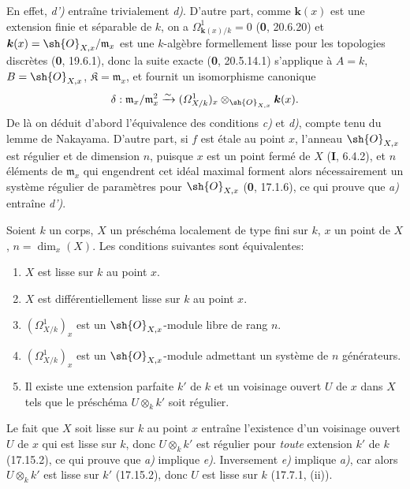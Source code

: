 En effet, \emph{d')} entraîne trivialement \emph{d)}. D'autre part, comme $\boldsymbol{k}(x)$ est une extension finie et séparable de $k$, on a $\Omega^1_{\mathbf{k}(x)/k}=0$ (\textbf{0}, 20.6.20) et $\boldsymbol{k}(x)=\sh{O}_{X,x}/\mathfrak m_x$ est une $k$-algèbre formellement lisse pour les topologies discrètes (\textbf{0}, 19.6.1), donc la suite exacte (\textbf{0}, 20.5.14.1) s'applique à $A=k$, $B=\sh{O}_{X,x}$, $\mathfrak{K}=\mathfrak m_x$, et fournit un isomorphisme canonique
\[
\delta:\mathfrak m_x/\mathfrak m_x^2\xrightarrow{\sim}(\varOmega^1_{X/k})_x\otimes_{\sh{O}_{X,x}}\boldsymbol{k}(x).
\]
De là on déduit d'abord l'équivalence des conditions \emph{c)} et \emph{d)}, compte tenu du lemme de Nakayama. D'autre part, si $f$ est étale au point $x$, l'anneau $\sh{O}_{X,x}$ est régulier et de dimension $n$, puisque $x$ est un point fermé de $X$ (\textbf{I}, 6.4.2), et $n$ éléments de $\mathfrak m_x$ qui engendrent cet idéal maximal forment alors nécessairement un système régulier de paramètres pour $\sh{O}_{X,x}$ (\textbf{0}, 17.1.6), ce qui prouve que \emph{a)} entraîne \emph{d')}.

\begin{proposition}[17.15.5]
\label{IV.17.15.5}
Soient $k$ un corps, $X$ un préschéma localement de type fini sur $k$, $x$ un point de $X$, $n=\dim_x(X)$. Les conditions suivantes sont équivalentes:
\begin{enumerate}
  \item[\textup{a)}] $X$ est lisse sur $k$ au point $x$.
  \item[\textup{b)}] $X$ est différentiellement lisse sur $k$ au point $x$.
  \item[\textup{c)}] $(\varOmega^1_{X/k})_x$ est un $\sh{O}_{X,x}$-module libre de rang $n$.
  \item[\textup{d)}] $(\varOmega^1_{X/k})_x$ est un $\sh{O}_{X,x}$-module admettant un système de $n$ générateurs.


  \item[\textup{e)}] Il existe une extension parfaite $k'$ de $k$ et un voisinage ouvert $U$ de $x$ dans $X$ tels que le préschéma $U\otimes_k k'$ soit régulier.
\end{enumerate}
\end{proposition}

Le fait que $X$ soit lisse sur $k$ au point $x$ entraîne l'existence d'un voisinage ouvert $U$ de $x$ qui est lisse sur $k$, donc $U\otimes_k k'$ est régulier pour \emph{toute} extension $k'$ de $k$ (17.15.2), ce qui prouve que \emph{a)} implique \emph{e)}. Inversement \emph{e)} implique \emph{a)}, car alors $U\otimes_k k'$ est lisse sur $k'$ (17.15.2), donc $U$ est lisse sur $k$ (17.7.1, (ii)).

